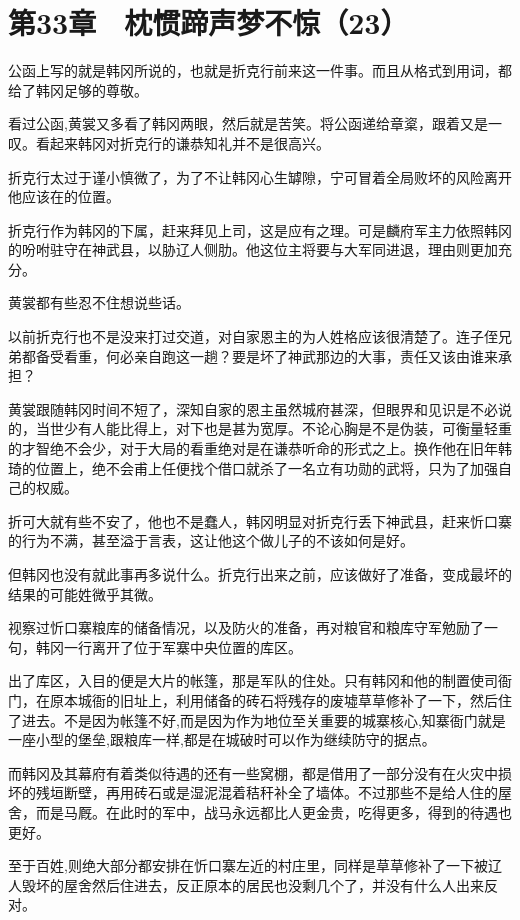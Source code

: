\section{第33章　枕惯蹄声梦不惊（23）}

公函上写的就是韩冈所说的，也就是折克行前来这一件事。而且从格式到用词，都给了韩冈足够的尊敬。

看过公函,黄裳又多看了韩冈两眼，然后就是苦笑。将公函递给章楶，跟着又是一叹。看起来韩冈对折克行的谦恭知礼并不是很高兴。

折克行太过于谨小慎微了，为了不让韩冈心生罅隙，宁可冒着全局败坏的风险离开他应该在的位置。

折克行作为韩冈的下属，赶来拜见上司，这是应有之理。可是麟府军主力依照韩冈的吩咐驻守在神武县，以胁辽人侧肋。他这位主将要与大军同进退，理由则更加充分。

黄裳都有些忍不住想说些话。

以前折克行也不是没来打过交道，对自家恩主的为人姓格应该很清楚了。连子侄兄弟都备受看重，何必亲自跑这一趟？要是坏了神武那边的大事，责任又该由谁来承担？

黄裳跟随韩冈时间不短了，深知自家的恩主虽然城府甚深，但眼界和见识是不必说的，当世少有人能比得上，对下也是甚为宽厚。不论心胸是不是伪装，可衡量轻重的才智绝不会少，对于大局的看重绝对是在谦恭听命的形式之上。换作他在旧年韩琦的位置上，绝不会甫上任便找个借口就杀了一名立有功勋的武将，只为了加强自己的权威。

折可大就有些不安了，他也不是蠢人，韩冈明显对折克行丢下神武县，赶来忻口寨的行为不满，甚至溢于言表，这让他这个做儿子的不该如何是好。

但韩冈也没有就此事再多说什么。折克行出来之前，应该做好了准备，变成最坏的结果的可能姓微乎其微。

视察过忻口寨粮库的储备情况，以及防火的准备，再对粮官和粮库守军勉励了一句，韩冈一行离开了位于军寨中央位置的库区。

出了库区，入目的便是大片的帐篷，那是军队的住处。只有韩冈和他的制置使司衙门，在原本城衙的旧址上，利用储备的砖石将残存的废墟草草修补了一下，然后住了进去。不是因为帐篷不好,而是因为作为地位至关重要的城寨核心,知寨衙门就是一座小型的堡垒,跟粮库一样,都是在城破时可以作为继续防守的据点。

而韩冈及其幕府有着类似待遇的还有一些窝棚，都是借用了一部分没有在火灾中损坏的残垣断壁，再用砖石或是湿泥混着秸秆补全了墙体。不过那些不是给人住的屋舍，而是马厩。在此时的军中，战马永远都比人更金贵，吃得更多，得到的待遇也更好。

至于百姓,则绝大部分都安排在忻口寨左近的村庄里，同样是草草修补了一下被辽人毁坏的屋舍然后住进去，反正原本的居民也没剩几个了，并没有什么人出来反对。


